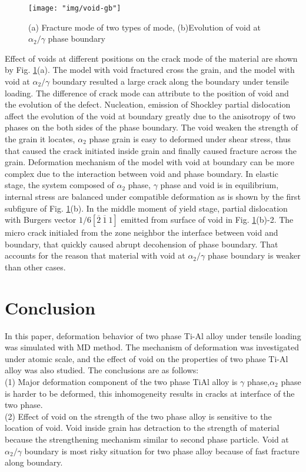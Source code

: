 \documentclass[materials,article,submit,moreauthors,pdftex,10pt,a4paper]{Definitions/mdpi}
\begin{document}
\begin{figure}[ht]
	\centering
	\texttt{[image: "img/void-gb"]}
	\caption{(a) Fracture mode of two types of mode,  (b)Evolution of void at $\alpha_2 / \gamma$ phase boundary}
	\label{fig:void-gb}
\end{figure}
Effect of voids at different positions on the crack mode of the material are shown by Fig. \ref{fig:void-gb}(a). The model with void fractured cross the grain, and the model with void at $\alpha_2 / \gamma$ boundary resulted a large crack along the boundary under tensile loading. The difference of crack mode can attribute to the position of void and the evolution of the defect. Nucleation, emission of Shockley partial dislocation affect the evolution of the void at boundary greatly due to the anisotropy of two phases on the both sides of the phase boundary. The void weaken the strength of the grain it locates,  $\alpha_2$ phase grain is easy to deformed under shear stress, thus that caused the crack initiated inside grain and finally caused fracture across the grain. Deformation mechanism of the model with void at boundary can be  more complex due to the interaction between void and phase boundary. In elastic stage, the system composed of $\alpha_2$ phase, $\gamma$ phase and void is in equilibrium, internal stress are balanced under compatible deformation as is shown by the first subfigure of Fig. \ref{fig:void-gb}(b). In the middle moment of yield stage, partial dislocation with Burgers vector $1/6[\overline{2}\ \overline{1}\ 1]$ emitted from surface of void in Fig. \ref{fig:void-gb}(b)-2. The micro crack initialed from the zone neighbor  the interface between void and boundary, that quickly caused abrupt decohension of phase boundary. That accounts for the reason that material with void at $\alpha_2 / \gamma$ phase boundary is weaker than other cases. 
\section{Conclusion}
In this paper, deformation behavior of two phase Ti-Al alloy under tensile loading was simulated with MD method. The mechanism of deformation was investigated under atomic scale, and the effect of void on the properties of two phase Ti-Al alloy was also studied.  The conclusions are as follows:\\
(1) Major deformation component of the two phase TiAl alloy is $\gamma$ phase,$\alpha_2$ phase is harder to be deformed, this inhomogeneity results in cracks at interface of the two phase. \\
(2) Effect of  void on the strength of the two phase alloy is sensitive to the location of  void. Void inside grain has detraction to the strength of material because the strengthening mechanism similar to second phase particle. Void at $\alpha_2 / \gamma$ boundary is most risky situation for two phase alloy because of fast fracture along boundary.
\end{document}
